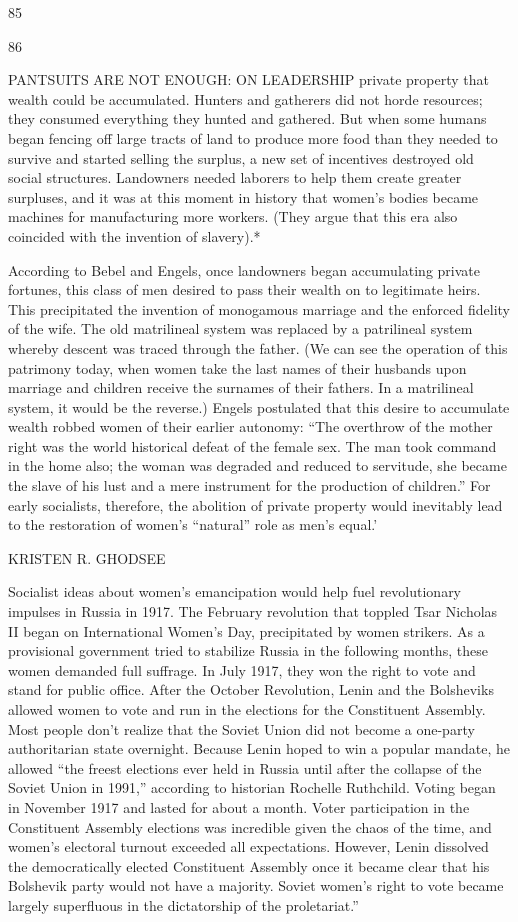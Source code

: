  \par 
85
 \par 
86
 \par 
PANTSUITS ARE NOT ENOUGH: ON LEADERSHIP private property that wealth could be accumulated. Hunters and gatherers did not horde resources; they consumed everything they hunted and gathered. But when some humans began fencing off large tracts of land to produce more food than they needed to survive and started selling the surplus, a new set of incentives destroyed old social structures. Landowners needed laborers to help them create greater surpluses, and it was at this moment in history that women’s bodies became machines for manufacturing more workers. (They argue that this era also coincided with the invention of slavery).*
 \par 
According to Bebel and Engels, once landowners began accumulating private fortunes, this class of men desired to pass their wealth on to legitimate heirs. This precipitated the invention of monogamous marriage and the enforced fidelity of the wife. The old matrilineal system was replaced by a patrilineal system whereby descent was traced through the father. (We can see the operation of this patrimony today, when women take the last names of their husbands upon marriage and children receive the surnames of their fathers. In a matrilineal system, it would be the reverse.) Engels postulated that this desire to accumulate wealth robbed women of their earlier autonomy: “The overthrow of the mother right was the world historical defeat of the female sex. The man took command in the home also; the woman was degraded and reduced to servitude, she became the slave of his lust and a mere instrument for the production of children.” For early socialists, therefore, the abolition of private property would inevitably lead to the restoration of women's “natural” role as men’s equal.’
 \par 
KRISTEN R. GHODSEE
 \par 
Socialist ideas about women’s emancipation would help fuel revolutionary impulses in Russia in 1917. The February revolution that toppled Tsar Nicholas II began on International Women’s Day, precipitated by women strikers. As a provisional government tried to stabilize Russia in the following months, these women demanded full suffrage. In July 1917, they won the right to vote and stand for public office. After the October Revolution, Lenin and the Bolsheviks allowed women to vote and run in the elections for the Constituent Assembly. Most people don’t realize that the Soviet Union did not become a one-party authoritarian state overnight. Because Lenin hoped to win a popular mandate, he allowed “the freest elections ever held in Russia until after the collapse of the Soviet Union in 1991,” according to historian Rochelle Ruthchild. Voting began in November 1917 and lasted for about a month. Voter participation in the Constituent Assembly elections was incredible given the chaos of the time, and women’s electoral turnout exceeded all expectations. However, Lenin dissolved the democratically elected Constituent Assembly once it became clear that his Bolshevik party would not have a majority. Soviet women’s right to vote became largely superfluous in the dictatorship of the proletariat.”
